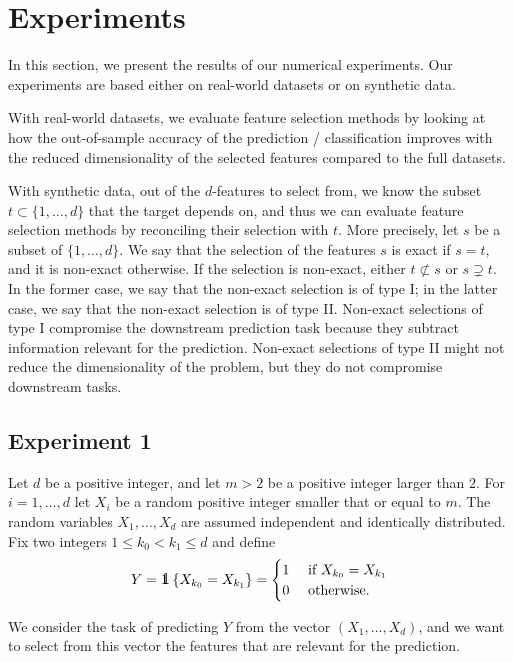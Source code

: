 \section{Experiments}
In this section,
we present the results of our numerical experiments.
Our experiments are based
either 
on real-world datasets
or on synthetic data.

With real-world datasets,
we evaluate
feature selection methods
by looking at 
how
the out-of-sample accuracy of the prediction / classification
improves with the reduced dimensionality of the selected features
compared to the full datasets.

With synthetic data, 
out 
of the $d$-features to select from,
we know the subset 
$t \subset \lbrace 1, \dots, d\rbrace$
that the target depends on,
and thus
we can evaluate feature selection methods
by reconciling their selection with $t$.
More precisely,
let 
$s$ 
be a subset of 
$\lbrace1, \dots, d\rbrace$.
We say that 
the selection of the features 
$s$ is exact if $s=t$,
and it is non-exact otherwise. 
If the selection is non-exact,
either 
$t \not \subset s$
or
$s \supsetneq t$.
In the former case, 
we say that the non-exact selection is of type I;
in the latter case,
we say that the non-exact selection is of type II. 
Non-exact selections of type I 
compromise the downstream prediction task 
because 
they subtract information relevant for the prediction.
Non-exact selections of type II
might not reduce the dimensionality of the problem,
but they do not compromise downstream tasks. 


\subsection{Experiment 1}
Let
$d$
be a positive integer,
and 
let 
$m > 2$
be  a positive integer larger than $2$.
For
$i = 1, \dots, d$
let
$X_i$
be a random  positive integer
smaller that or equal to $m$.
The random variables
$X_1, \dots, X_d$
are assumed independent and identically distributed.
Fix 
two integers
$ 1 \leq k_0 < k_1 \leq d$
and 
define
\begin{equation}
	\label{eq.exp1Y}
	Y = \one\left\lbrace
	X_{k_0} = X_{k_1}
	\right
	\rbrace
	=
	\begin{cases}
		1 & \text{ if } X_{k_0} = X_{k_1}
		\\
		0 & \text{ otherwise}.
	\end{cases}
\end{equation}

We consider the task of predicting $Y$ from the vector 
$(X_1, \dots, X_d)$,
and 
we want to select 
from this vector 
the features that are relevant for the prediction.

